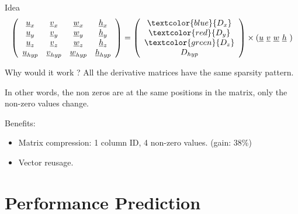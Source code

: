 \documentclass{beamer}
\begin{document}
\begin{frame}
  \begin{block}{Idea}
    \scriptsize
    \begin{equation}
      \left( \begin{array}{cccc}
          \underline{u}_x     & \underline{v}_x     & \underline{w}_x     & \underline{h}_x \\
          \underline{u}_y     & \underline{v}_y     & \underline{w}_y     & \underline{h}_y \\
          \underline{u}_z     & \underline{v}_z     & \underline{w}_z     & \underline{h}_z \\
          \underline{u}_{hyp} & \underline{v}_{hyp} & \underline{w}_{hyp} & \underline{h}_{hyp}
        \end{array} \right)
      = \left(
        \begin{array}{c}
          \textcolor{blue}{D_{x}}\\ \textcolor{red}{D_{y}}\\ \textcolor{green}{D_{z}}\\ D_{hyp}
        \end{array}\right)
      \times \left(\underline{u} \,\, \underline{v} \,\, \underline{w} \,\, \underline{h} \,\,\right) \nonumber
      \vspace{-1ex}
    \end{equation}
  \end{block}  
  
\pause
    
  \begin{block}{Why would it work ?}
    All the derivative matrices have the same sparsity pattern.

    In other words, the non zeros are at the same positions in the
    matrix, only the non-zero values change.

    Benefits:
    \begin{itemize}
    \item Matrix compression: 1 column ID, 4 non-zero values. (gain: 38\%)
    \item Vector reusage.
    \end{itemize}
  \end{block}
\end{frame}

\section{Performance Prediction}
\end{document}
